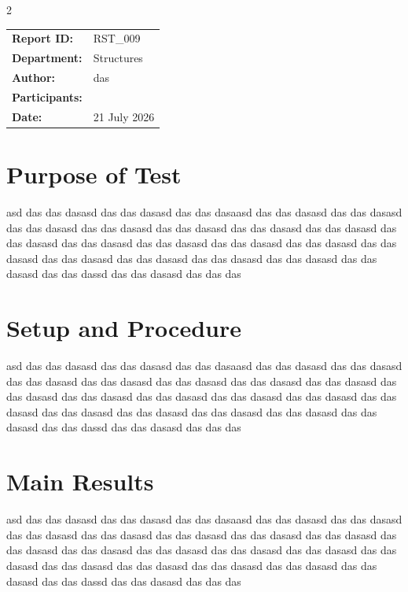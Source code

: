 \documentclass[11pt,a4paper]{article}
\begin{document}
\begin{multicols}{2}

\small
\renewcommand{\arraystretch}{1.1}

\begin{tabular}{
    @{}
    >{\bfseries}p{2.1cm}
    p{\dimexpr\columnwidth-2.1cm\relax}
    @{}
}
Report ID: &
RST\_009 \\

Department: &
Structures \\

Author: &
das \\

Participants: &
 \\

Date: &
21 July 2026 \\
\end{tabular}

\normalsize
\vspace{0.4em}

\section*{Purpose of Test}
asd das das dasasd das das dasasd das das dasaasd das das dasasd das das dasasd das das dasasd das das dasasd das das dasasd das das dasasd das das dasasd das das dasasd das das dasasd das das dasasd das das dasasd das das dasasd das das dasasd das das dasasd das das dasasd das das dasasd das das dasasd das das dasasd das das dassd das das dasasd das das das

\section*{Setup and Procedure}
asd das das dasasd das das dasasd das das dasaasd das das dasasd das das dasasd das das dasasd das das dasasd das das dasasd das das dasasd das das dasasd das das dasasd das das dasasd das das dasasd das das dasasd das das dasasd das das dasasd das das dasasd das das dasasd das das dasasd das das dasasd das das dasasd das das dassd das das dasasd das das das

\section*{Main Results}
asd das das dasasd das das dasasd das das dasaasd das das dasasd das das dasasd das das dasasd das das dasasd das das dasasd das das dasasd das das dasasd das das dasasd das das dasasd das das dasasd das das dasasd das das dasasd das das dasasd das das dasasd das das dasasd das das dasasd das das dasasd das das dasasd das das dassd das das dasasd das das das


\end{multicols}
\end{document}
